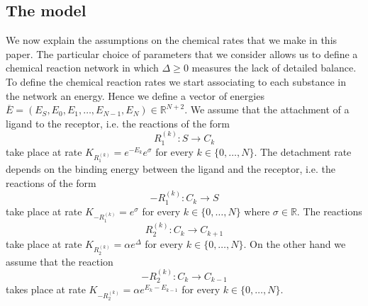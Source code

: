 \documentclass{article}
\numberwithin{equation}{section}
\theoremstyle{plain}
\begin{document}
\subsection{The model} \label{sec:model}
We now explain the assumptions on the chemical rates that we make in this paper. 
The particular choice of parameters that we consider allows us to define a chemical reaction network in which $\Delta \geq 0$ measures the lack of detailed balance. 
To define the chemical reaction rates we start associating to each substance in the network an energy. Hence we define a vector of energies $ \overline E=(E_S, E_0, E_1, \dots, E_{N-1}, E_N) \in \mathbb R^{N+2} $.
We assume that the attachment of a ligand to the receptor, i.e. the reactions of the form 
\[
R_1^{(k)} : S \rightarrow  C_k
\] 
take place at rate $K_{R_1^{(k)}} =e^{- E_k } e^{\sigma}$ for every $k \in \{ 0, \dots , N \} $. 
The detachment rate depends on the binding energy between the ligand and the receptor, i.e. the reactions of the form
\[
-R_1^{(k)}:  C_{k} \rightarrow S
\] 
take place at rate $K_{- R_1^{(k)}} = e^{\sigma} $ for every $k \in \{0, \dots, N \} $ where $\sigma \in \mathbb R$. 
The reactions
\[ 
R^{(k)}_2: C_k \rightarrow C_{k+1} \]
take place at rate $K_{R_2^{(k)}}= \alpha e^{\Delta}$ for every $k \in \{ 0, \dots , N \} $. 
On the other hand we assume that the reaction 
\[
-R^{(k)}_2:
C_k \rightarrow C_{k-1} \]
takes place at rate $K_{-R^{(k)}_2}=\alpha e^{E_k- E_{k-1} }$ for every $k \in \{0, \dots , N \} $.
\end{document}
